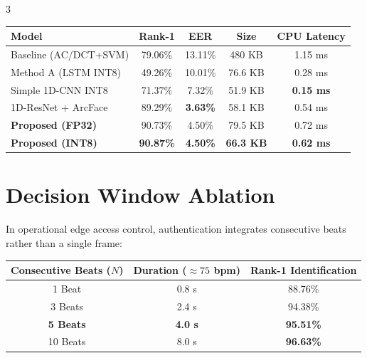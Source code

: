 \documentclass{article}
\begin{document}
\begin{multicols}{3}
\vspace{2mm}
\begin{center}
\begin{tabular}{lcccc}
\toprule
\textbf{Model} & \textbf{Rank-1} & \textbf{EER} & \textbf{Size} & \textbf{CPU Latency} \\
\midrule
Baseline (AC/DCT+SVM) & 79.06\% & 13.11\% & 480 KB & 1.15 ms \\
Method A (LSTM INT8) & 49.26\% & 10.01\% & 76.6 KB & 0.28 ms \\
Simple 1D-CNN INT8 & 71.37\% & 7.32\% & 51.9 KB & \textbf{0.15 ms} \\
1D-ResNet + ArcFace & 89.29\% & \textbf{3.63\%} & 58.1 KB & 0.54 ms \\
\textbf{Proposed (FP32)} & 90.73\% & 4.50\% & 79.5 KB & 0.72 ms \\
\textbf{Proposed (INT8)} & \textbf{90.87\%} & \textbf{4.50\%} & \textbf{66.3 KB} & \textbf{0.62 ms} \\
\bottomrule
\end{tabular}
\end{center}
\vspace{2mm}

\section*{\color{primary} Decision Window Ablation}
In operational edge access control, authentication integrates consecutive beats rather than a single frame:

\vspace{2mm}
\begin{center}
\begin{tabular}{ccc}
\toprule
\textbf{Consecutive Beats ($N$)} & \textbf{Duration ($\approx 75$ bpm)} & \textbf{Rank-1 Identification} \\
\midrule
1 Beat & 0.8 s & 88.76\% \\
3 Beats & 2.4 s & 94.38\% \\
\textbf{5 Beats} & \textbf{4.0 s} & \textbf{95.51\%} \\
10 Beats & 8.0 s & \textbf{96.63\%} \\
\bottomrule
\end{tabular}
\end{center}
\vspace{2mm}

\columnbreak


\end{multicols}
\end{document}
